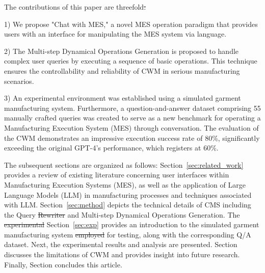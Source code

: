 \documentclass[preprint,12pt]{elsarticle}
\providecommand{\DIFaddtex}[1]{{\protect\color{blue}\uwave{#1}}} %
\providecommand{\DIFdeltex}[1]{{\protect\color{red}\sout{#1}}}                      %
\providecommand{\DIFaddbegin}{} %
\providecommand{\DIFaddend}{} %
\providecommand{\DIFdelbegin}{} %
\providecommand{\DIFdelend}{} %
\providecommand{\DIFadd}[1]{\texorpdfstring{\DIFaddtex{#1}}{#1}} %
\providecommand{\DIFdel}[1]{\texorpdfstring{\DIFdeltex{#1}}{}} %
\newcommand{\DIFscaledelfig}{0.5}
\newlength{\DIFdelgraphicswidth} %
\newlength{\DIFdelgraphicsheight} %
\newcommand{\DIFaddincludegraphics}[2][]{{\color{blue}\fbox{\DIFOincludegraphics[#1]{#2}}}} %
\newcommand{\DIFdelincludegraphics}[2][]{%
\sbox{\DIFdelgraphicsbox}{\DIFOincludegraphics[#1]{#2}}%
\settoboxwidth{\DIFdelgraphicswidth}{\DIFdelgraphicsbox} %
\settoboxtotalheight{\DIFdelgraphicsheight}{\DIFdelgraphicsbox} %
\scalebox{\DIFscaledelfig}{%
\parbox[b]{\DIFdelgraphicswidth}{\usebox{\DIFdelgraphicsbox}\\[-\baselineskip] \rule{\DIFdelgraphicswidth}{0em}}\llap{\resizebox{\DIFdelgraphicswidth}{\DIFdelgraphicsheight}{%
\setlength{\unitlength}{\DIFdelgraphicswidth}%
\begin{picture}(1,1)%
\thicklines\linethickness{2pt} %
{\color[rgb]{1,0,0}\put(0,0){\framebox(1,1){}}}%
{\color[rgb]{1,0,0}\put(0,0){\line( 1,1){1}}}%
{\color[rgb]{1,0,0}\put(0,1){\line(1,-1){1}}}%
\end{picture}%
}\hspace*{3pt}}} %
} %
\DeclareRobustCommand{\DIFaddbegin}{\DIFOaddbegin \let\includegraphics\DIFaddincludegraphics} %
\DeclareRobustCommand{\DIFaddend}{\DIFOaddend \let\includegraphics\DIFOincludegraphics} %
\DeclareRobustCommand{\DIFdelbegin}{\DIFOdelbegin \let\includegraphics\DIFdelincludegraphics} %
\DeclareRobustCommand{\DIFdelend}{\DIFOaddend \let\includegraphics\DIFOincludegraphics} %
\begin{document}


The contributions of this paper are threefold\DIFdelbegin \DIFdel{:
}\DIFdelend \DIFaddbegin \DIFadd{.
}\DIFaddend 

1) We propose "Chat with MES," a novel MES operation paradigm that provides users with an interface for manipulating the MES system via \DIFaddbegin \DIFadd{natural }\DIFaddend language.

2) The Multi-step Dynamical Operations Generation is proposed to handle complex user queries by executing a sequence of basic operations. This technique ensures the controllability and reliability of CWM in serious manufacturing scenarios.

3) An experimental environment was established using a simulated garment manufacturing system. Furthermore, a \DIFaddbegin \DIFadd{new }\DIFaddend question-and-answer dataset comprising 55 manually crafted queries was created to serve as a new benchmark for operating a Manufacturing Execution System (MES) through conversation.  
The evaluation of the CWM demonstrates an impressive execution success rate of 80\%, significantly exceeding the original GPT-4's performance, which registers at 60\%.

The subsequent sections are organized as follows:
Section~\ref{sec:related_work} provides a review of existing literature concerning user interfaces within Manufacturing Execution Systems (MES), as well as the application of Large Language Models (LLM) in manufacturing processes and techniques associated with LLM.
Section~\ref{sec:method} depicts the technical details of CMS including the Query \DIFdelbegin \DIFdel{Rewriter }\DIFdelend \DIFaddbegin \DIFadd{Rewriting }\DIFaddend and Multi-step Dynamical Operations Generation.
The \DIFdelbegin \DIFdel{experimental }\DIFdelend \DIFaddbegin \DIFadd{experiment }\DIFaddend Section~\ref{sec:exp} provides an introduction to the simulated garment manufacturing system \DIFdelbegin \DIFdel{employed }\DIFdelend \DIFaddbegin \DIFadd{used }\DIFaddend for testing, along with the corresponding Q/A dataset.
Next, the experimental results and analysis are presented.
Section \DIFdelbegin %
\DIFdelend \DIFaddbegin \DIFadd{\ref{sec:discussion} }\DIFaddend discusses the limitations of CWM and provides insight into future research. 
Finally, Section \DIFdelbegin %
\DIFdelend \DIFaddbegin \DIFadd{\ref{sec:conclusion} }\DIFaddend concludes this article.
\end{document}
